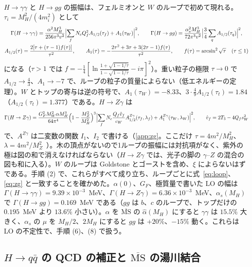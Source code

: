 \documentclass[a4paper,10pt]{ltjsarticle}
\newcommand{\MSbar}{\overline{\mathrm{MS}}}
\begin{document}
$H\to\gamma\gamma$ と $H\to gg$ の振幅は、フェルミオンと $W$ のループで初めて現れる。$\tau_i=M_H^2/(4m_i^2)$ として~\cite{ellis76,svvz79,djouadi08}
\begin{equation}
\begin{gathered}
\Gamma(H\to\gamma\gamma)=\frac{\alpha^2M_H^3}{256\pi^3v^2}\Bigl|\sum_fN_cQ_f^2A_{1/2}(\tau_f)+A_1(\tau_W)\Bigr|^2,\qquad
\Gamma(H\to gg)=\frac{\alpha_s^2M_H^3}{72\pi^3v^2}\Bigl|\frac34\sum_qA_{1/2}(\tau_q)\Bigr|^2,\\
A_{1/2}(\tau)=\frac{2[\tau+(\tau-1)f(\tau)]}{\tau^2},\qquad A_1(\tau)=-\frac{2\tau^2+3\tau+3(2\tau-1)f(\tau)}{\tau^2},\qquad f(\tau)=\arcsin^2\sqrt\tau\quad(\tau\le1)
\end{gathered}
\label{eq:loop}
\end{equation}
になる（$\tau>1$ では $f=-\frac14[\ln\frac{1+\sqrt{1-1/\tau}}{1-\sqrt{1-1/\tau}}-i\pi]^2$）。重い粒子の極限 $\tau\to0$ で $A_{1/2}\to\frac43$、$A_1\to-7$ で、ループの粒子の質量によらない（低エネルギーの定理）。$W$ とトップの寄与は逆の符号で、$A_1(\tau_W)=-8.33$、$3\cdot\frac49A_{1/2}(\tau_t)=1.84$（$A_{1/2}(\tau_t)=1.377$）である。$H\to Z\gamma$ は
\begin{equation}
\Gamma(H\to Z\gamma)=\frac{G_F^2M_W^2\alpha M_H^3}{64\pi^4}\Bigl(1-\frac{M_Z^2}{M_H^2}\Bigr)^3\Bigl|\sum_fN_c\frac{Q_f\hat v_f}{c_W}A^{Z\gamma}_{1/2}(\tau_f,\lambda_f)+A^{Z\gamma}_1(\tau_W,\lambda_W)\Bigr|^2,\qquad\hat v_f=2T_3-4Q_fs_W^2
\label{eq:zg}
\end{equation}
で、$A^{Z\gamma}$ は二変数の関数 $I_1$、$I_2$ で書ける（\ref{app:zg}。ここだけ $\tau=4m^2/M_H^2$、$\lambda=4m^2/M_Z^2$~\cite{djouadi08}）。木の頂点がないので1ループの振幅には対抗項がなく、紫外の極は図の和で消えなければならない（$H\to Z\gamma$ では、光子の脚の $\gamma$--$Z$ の混合の図も和に入る）。$W$ のループは Goldstone とゴーストを含め、$\xi$ によらないはずである。手順 (2) で、これらがすべて成り立ち、ループごとに式~\eqref{eq:loop}、\eqref{eq:zg} と一致することを確かめた。$\alpha(0)$、$G_F$、極質量で書いた LO の幅は $\Gamma(H\to\gamma\gamma)=9.39\times10^{-3}$~MeV、$\Gamma(H\to Z\gamma)=6.36\times10^{-3}$~MeV、$\alpha_s(M_H)$ で $\Gamma(H\to gg)=0.169$~MeV である（$gg$ は $b$、$c$ のループで、トップだけの $0.195$~MeV より $13.6\%$ 小さい）。$\alpha$ を $\MSbar$ の $\hat\alpha(M_H)$ にすると $\gamma\gamma$ は $15.5\%$ 大きく、$\alpha_s$ の $\mu$ を $M_H/2$、$2M_H$ にすると $gg$ は $+20\%$、$-15\%$ 動く。これらは LO の不定性で、手順 (6)、(8) で扱う。

\subsection{$H\to q\bar q$ の QCD の補正と $\MSbar$ の湯川結合}\label{sec:hqq}
\end{document}
